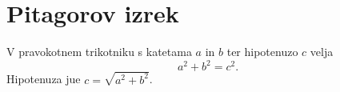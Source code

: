 \documentclass{article}
\begin{document}
\section*{Pitagorov izrek}
V pravokotnem trikotniku s katetama \(a\) in \(b\) ter hipotenuzo \(c\) velja
\[ a^2 + b^2 = c^2. \]
Hipotenuza jue $c = \sqrt{a^2 + b^2}$. 
\end{document}
